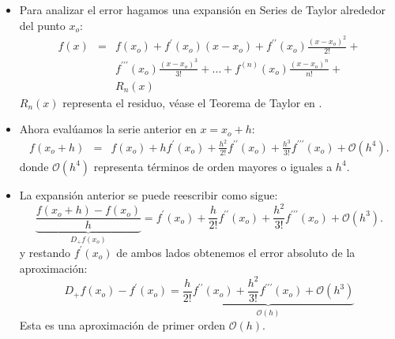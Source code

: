 \documentclass{beamer}
\begin{document}
\begin{frame}

\begin{itemize}
	\item Para analizar el error hagamos una expansión en Series de Taylor
	alrededor del punto $x_o$: 
%	
	\begin{eqnarray*}
 		f(x) & = & f(x_o) + f^\prime(x_o)(x - x_o) + f^{\prime\prime}(x_o)\frac{(x - x_o)^2}{2!} + \\
      		 & & f^{\prime\prime\prime}(x_o)\frac{(x - x_o)^3}{3!} + \dots + f^{(n)}(x_o)\frac{(x - x_o)^n}{n!} + \\
   			 & & R_n(x)
	\end{eqnarray*}
%	
    $R_n(x)$ representa el residuo, véase el Teorema de Taylor en \cite{Burden}.

\strut
	
	\item Ahora evalúamos la serie anterior en $x = x_o+h$:
	\begin{eqnarray*}
		f(x_o+h) & = & f(x_o) + h f^\prime(x_o) + \frac{h^2}{2!}f^{\prime\prime}(x_o)
		+ \frac{h^3}{3!}f^{\prime\prime\prime}(x_o) + \mathcal{O}(h^4).	
	\end{eqnarray*}
	donde $\mathcal{O}(h^4)$ representa términos de orden mayores o iguales a $h^4$.
\end{itemize}
\end{frame}

\begin{frame}
\begin{itemize}
	\item La expansión anterior se puede reescribir como sigue:
	\[
	\underbrace{\frac{f(x_o+h)-f(x_o)}{h}}_{D_+f(x_o)} = f^\prime(x_o) + \frac{h}{2!}f^{\prime\prime}(x_o)
	+ \frac{h^2}{3!}f^{\prime\prime\prime}(x_o) + \mathcal{O}(h^3). 
	\]
	y restando $f^\prime(x_o)$ de ambos lados obtenemos el error absoluto de la aproximación:
	\[ 
	D_+f(x_o) - f^\prime(x_o) = \underbrace{\frac{h}{2!}f^{\prime\prime}(x_o)
		+ \frac{h^2}{3!}f^{\prime\prime\prime}(x_o) + \mathcal{O}(h^3)}_{\mathcal{O}(h)}
	\]
Esta es una aproximación de primer orden $\mathcal{O}(h)$.
\end{itemize}
\end{frame}
\end{document}
